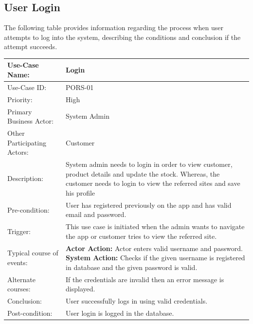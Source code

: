 \subsection{User Login}
The following table provides information regarding the process when user attempts to log into the system, describing the conditions and conclusion if the attempt succeeds. 
\begin{center}
    \begin{tabular}{ @{}|p{5cm}||p{7cm}|  }
    \hline
    Use-Case Name: & Login  \\ \hline
    Use-Case ID: & PORS-01 \\ \hline
    Priority: & High \\ \hline
    Primary Business Actor: & System Admin \\ \hline
    Other Participating Actors: & Customer \\ \hline
    Description: & System admin needs to login in order to view customer, product details and update the stock. Whereas, the customer needs to login to view the referred sites and save his profile \\ \hline
    Pre-condition: & User has registered previously on the app and has valid email and password.  \\ \hline
    Trigger: & This use case is initiated when the admin wants to navigate the app or customer tries to view the referred site. \\ \hline
    Typical course of events: & \textbf{Actor Action:} \newline Actor enters valid username and password. \newline \textbf{System Action:} \newline Checks if the given username is registered in database and the given password is valid.
 \\ \hline
    Alternate courses: & If the credentials are invalid then an error message is displayed.  \\ \hline
    Conclusion: &  User successfully logs in using valid credentials.\\ \hline
    Post-condition: & User login is logged in the database. \\ \hline
    \end{tabular}
\end{center}

